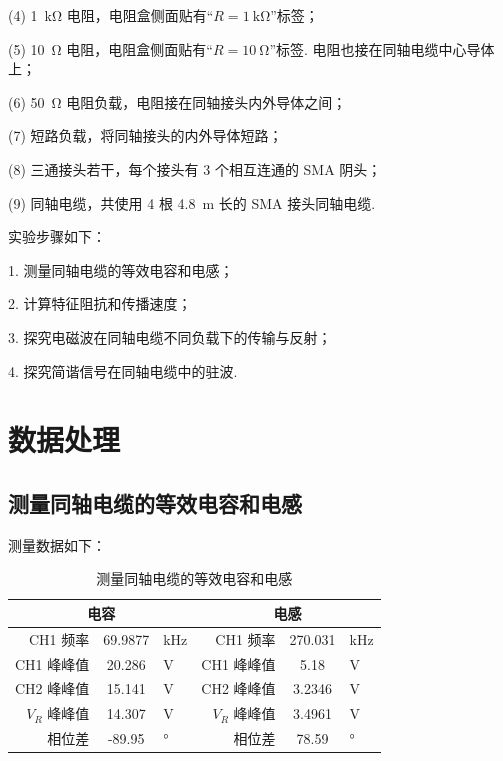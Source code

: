 \documentclass{customDoc}
\begin{document}
(4) \SI{1}{\kilo\ohm} 电阻，电阻盒侧面贴有“$R=\SI{1}{\kilo\ohm}$”标签；

(5) \SI{10}{\ohm} 电阻，电阻盒侧面贴有“$R=\SI{10}{\ohm}$”标签. 电阻也接在同轴电缆中心导体上；

(6) \SI{50}{\ohm} 电阻负载，电阻接在同轴接头内外导体之间；

(7) 短路负载，将同轴接头的内外导体短路；

(8) 三通接头若干，每个接头有 3 个相互连通的 SMA 阴头；

(9) 同轴电缆，共使用 4 根 \SI{4.8}{\metre} 长的 SMA 接头同轴电缆.

实验步骤如下：

1. 测量同轴电缆的等效电容和电感；

2. 计算特征阻抗和传播速度；

3. 探究电磁波在同轴电缆不同负载下的传输与反射；

4. 探究简谐信号在同轴电缆中的驻波.

\section{数据处理}

\subsection{测量同轴电缆的等效电容和电感}

测量数据如下：

\begin{table}[htbp]
  \centering
  \caption{测量同轴电缆的等效电容和电感}
    \begin{tabular}{|r|c|l|r|c|l|}
    \hline
    \multicolumn{3}{|c|}{电容} & \multicolumn{3}{c|}{电感} \\
    \hline
    CH1 频率 & 69.9877 & \si{\kilo\hertz}   & CH1 频率 & 270.031 & \si{\kilo\hertz} \\
    \hline
    CH1 峰峰值 & 20.286 & \si{\volt}     & CH1 峰峰值 & 5.18  & \si{\volt} \\
    \hline
    CH2 峰峰值 & 15.141 & \si{\volt}     & CH2 峰峰值 & 3.2346 & \si{\volt} \\
    \hline
    $V_R$ 峰峰值 & 14.307 & \si{\volt}     & $V_R$ 峰峰值 & 3.4961 & \si{\volt} \\
    \hline
    相位差   & -89.95 & \si{\degree}     & 相位差   & 78.59 & \si{\degree} \\
    \hline
    \end{tabular}
\end{table}
\end{document}
